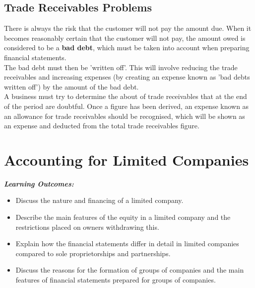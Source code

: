 \documentclass{report}
\newenvironment{blackbox}[1][Black]
  {\begin{tcolorbox}[colframe=#1,colback=white]}
  {\end{tcolorbox}}
\begin{document}
\section{Trade Receivables Problems}

There is always the risk that the customer will not pay the amount due. When it becomes reasonably certain that the customer will not pay, the amount owed is considered to be a \textbf{bad debt}, which must be taken into account when preparing financial statements.\\

The bad debt must then be 'written off'. This will involve reducing the trade receivables and increasing expenses (by creating an expense known as 'bad debts written off') by the amount of the bad debt.\\

A business must try to determine the about of trade receivables that at the end of the period are doubtful. Once a figure has been derived, an expense known as an allowance for trade receivables should be recognised, which will be shown as an expense and deducted from the total trade receivables figure.

\chapter{Accounting for Limited Companies}
\begin{blackbox}
    \textit{\textbf{Learning Outcomes:}}
    \begin{itemize}
        \item Discuss the nature and financing of a limited company.
        \item Describe the main features of the equity in a limited company and the restrictions placed on owners withdrawing this.
        \item Explain how the financial statements differ in detail in limited companies compared to sole proprietorships and partnerships.
        \item Discuss the reasons for the formation of groups of companies and the main features of financial statements prepared for groups of companies.
    \end{itemize}
\end{blackbox}
\end{document}
